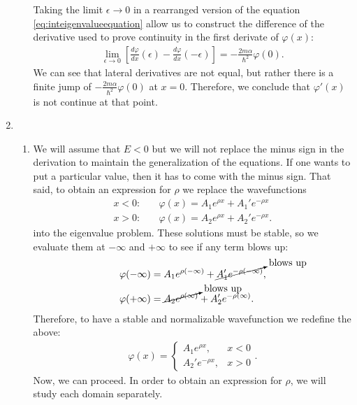 \documentclass[letterpaper,11pt,twoside]{article}
\begin{document}
\begin{enumerate}[itemsep=0pt,topsep=0pt,label=(\alph*)]
\begin{enumerate}[itemsep=0pt,topsep=0pt,label=(a.\arabic*)]
    Taking the limit $\epsilon\to0$ in a rearranged version of the equation \eqref{eq:inteigenvalueequation} allow us to construct the difference of the 
    derivative used to prove continuity in the first derivate of $\varphi(x)$:
    \begin{align*}
      \lim_{\epsilon\to0}\left[\frac{d\varphi}{dx}(\epsilon)
        -\frac{d\varphi}{dx}(-\epsilon)\right]=-\frac{2m\alpha}{\hbar^2}\varphi(0).
    \end{align*}
    We can see that lateral derivatives are not equal, but rather there is a finite jump of $-\frac{2m\alpha}{\hbar^2}\varphi(0)$ at $x=0$. Therefore, we conclude that 
    $\varphi'(x)$ is not continue at that point.
  \end{enumerate}
  \item
    \begin{enumerate}[itemsep=0pt,topsep=0pt,label=(b.\arabic*)]
      \item We will assume that $E<0$ but we will not replace the minus sign in the derivation to maintain the generalization of the equations.
      If one wants to put a particular value, then it has to come with the minus sign.
      That said, to obtain an expression for $\rho$ we replace the wavefunctions 
      \begin{align*}
        x<0:&\quad\varphi(x)=A_1e^{\rho x}+A_1'e^{-\rho x}\\
        x>0:&\quad\varphi(x)=A_2e^{\rho x}+A_2'e^{-\rho x}.
      \end{align*}
      into the eigenvalue problem. These solutions must be stable, so we evaluate them at $-\infty$ and $+\infty$ to see if any term blows up:
      \begin{align*}
        \varphi(-\infty)&=A_1e^{\rho(-\infty)}+\cancelto{\text{blows up}}{A_1'e^{-\rho(-\infty)}},\\
        \varphi(+\infty)&=\cancelto{\text{blows up}}{A_2e^{\rho(\infty)}}+A_2'e^{-\rho(\infty)}.
      \end{align*}
      Therefore, to have a stable and normalizable wavefunction we redefine the above:
      \begin{align*}
        \varphi(x)=\begin{cases}
          A_1e^{\rho x},&x<0\\
          A_2'e^{-\rho x},&x>0
        \end{cases}.
      \end{align*}
      Now, we can proceed. In order to obtain an expression for $\rho$, we will study each domain separately. 


\end{enumerate}
\end{enumerate}
\end{document}
